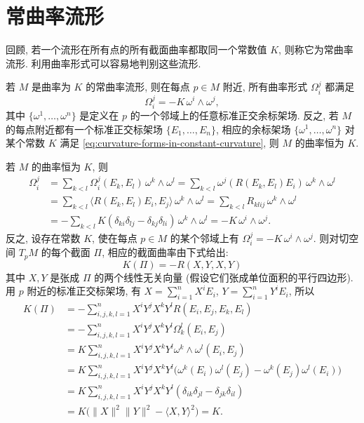 \section{常曲率流形}\label{sec:manifolds-of-constant-curvature}

回顾, 若一个流形在所有点的所有截面曲率都取同一个常数值 $K$, 则称它为常曲率流形. 利用曲率形式可以容易地判别这些流形.

\begin{RiemannLemma}\label{lem:curvature-forms-characterize-constant-curvature}
若 $M$ 是曲率为 $K$ 的常曲率流形, 则在每点 $p\in M$ 附近, 所有曲率形式 $\Omega_i^j$ 都满足
\begin{equation}\label{eq:curvature-forms-in-constant-curvature}
  \Omega_i^j=-K\,\omega^i\wedge\omega^j,
\end{equation}
其中 $\{\omega^1,\ldots,\omega^n\}$ 是定义在 $p$ 的一个邻域上的任意标准正交余标架场. 反之, 若 $M$ 的每点附近都有一个标准正交标架场 $\{E_1,\ldots,E_n\}$, 相应的余标架场 $\{\omega^1,\ldots,\omega^n\}$ 对某个常数 $K$ 满足 \eqref{eq:curvature-forms-in-constant-curvature}, 则 $M$ 的曲率恒为 $K$.
\end{RiemannLemma}

\begin{RiemannProof}
若 $M$ 的曲率恒为 $K$, 则
\begin{align*}
  \Omega_i^j&=\sum_{k<l}\Omega_i^j(E_k,E_l)\,\omega^k\wedge\omega^l
  =\sum_{k<l}\omega^j(R(E_k,E_l)E_i)\,\omega^k\wedge\omega^l\\
  &=\sum_{k<l}\langle R(E_k,E_l)E_i,E_j\rangle\,\omega^k\wedge\omega^l
  =\sum_{k<l}R_{klij}\,\omega^k\wedge\omega^l\\
  &=-\sum_{k<l}K(\delta_{ki}\delta_{lj}-\delta_{kj}\delta_{li})\,\omega^k\wedge\omega^l
  =-K\,\omega^i\wedge\omega^j.
\end{align*}
反之, 设存在常数 $K$, 使在每点 $p\in M$ 的某个邻域上有 $\Omega_i^j=-K\,\omega^i\wedge\omega^j$. 则对切空间 $T_pM$ 的每个截面 $\Pi$, 相应的截面曲率由下式给出:
\[
  K(\Pi)=-R(X,Y,X,Y)
\]
其中 $X,Y$ 是张成 $\Pi$ 的两个线性无关向量 (假设它们张成单位面积的平行四边形). 用 $p$ 附近的标准正交标架场, 有 $X=\sum_{i=1}^nX^iE_i$, $Y=\sum_{i=1}^nY^iE_i$, 所以
\begin{align*}
  K(\Pi)&=-\sum_{i,j,k,l=1}^n X^iY^jX^kY^lR(E_i,E_j,E_k,E_l)\\
  &=-\sum_{i,j,k,l=1}^n X^iY^jX^kY^l\Omega_k^l(E_i,E_j)\\
  &=K\sum_{i,j,k,l=1}^n X^iY^jX^kY^l\omega^k\wedge\omega^l(E_i,E_j)\\
  &=K\sum_{i,j,k,l=1}^n X^iY^jX^kY^l
    \bigl(\omega^k(E_i)\omega^l(E_j)-\omega^k(E_j)\omega^l(E_i)\bigr)\\
  &=K\sum_{i,j,k,l=1}^n X^iY^jX^kY^l(\delta_{ik}\delta_{jl}-\delta_{jk}\delta_{il})\\
  &=K\bigl(\lVert X\rVert^2\lVert Y\rVert^2-\langle X,Y\rangle^2\bigr)=K.
\end{align*}
\end{RiemannProof}

